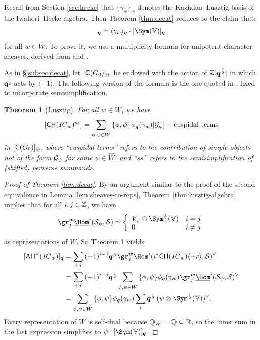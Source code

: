 \documentclass[a4paper,10pt,leqno]{amsart}
\theoremstyle{plain}
\theoremstyle{plain}
\newtheorem{thm}{Theorem}[subsection]
\theoremstyle{plain}
\theoremstyle{definition}
\theoremstyle{remark}
\newcommand{\IC}{\mathit{IC}}
\newcommand{\Q}{\bm{q}}
\newcommand{\Tr}[1]{\langle{#1}\rangle_{\Q}}
\begin{document}
Recall from Section \ref{sec:hecke} that $\{\gamma_w\}_w$ denotes the Kazhdan--Lusztig basis of the Iwahori--Hecke algebra.
Then Theorem \ref{thm:decat} reduces to the claim that:
\begin{align}
[\sf{AH}^\vee(\IC_w)]_{\Q} = \Tr{\gamma_w} \cdot [\Sym(\bb{V})]_{\Q}
\end{align}
for all $w \in W$.
To prove it, we use a multiplicity formula for unipotent character sheaves, derived from \cite[Cor.\ 14.11]{lusztig_1985_3} and \cite[Thm.\ 23.1]{lusztig_1986}.

As in \S\ref{subsec:decat}, let $[\sf{C}(G_0)]_\oplus$ be endowed with the action of $\bb{Z}[\Q^{\frac{1}{2}}]$ in which $\Q^{\frac{1}{2}}$ acts by $\langle -1\rangle$.
The following version of the formula is the one quoted in \cite[413]{ww_2008}, fixed to incorporate semisimplification.

\begin{thm}[Lusztig]\label{thm:lusztig-character}
For all $w \in W$, we have
\begin{align}
{[\sf{CH}(\IC_w)^{ss}]} = \sum_{\phi, \psi \in \hat{W}}
{\{\phi, \psi\}} \phi_{\Q}(\gamma_w) [\cal{G}_\psi] + \text{cuspidal terms}
\end{align}
in $[\sf{C}(G_0)]_\oplus$, where ``cuspidal terms'' refers to the contribution of simple objects not of the form $\cal{G}_\psi$ for some $\psi \in \hat{W}$, and ``$ss$'' refers to the semisimplification of (shifted) perverse summands.
\end{thm}

\begin{proof}[Proof of Theorem \ref{thm:decat}]
By an argument similar to the proof of the second equivalence in Lemma \ref{lem:sheaves-to-reps}, Theorem  \ref{thm:lusztig-algebra} implies that for all $i, j \in \bb{Z}$, we have
\begin{align}
\gr_j^{\bm{w}} \SHom^i(\cal{S}_\psi, \cal{S}) \simeq 
\left\{\begin{array}{ll}
V_\psi \otimes \Sym^{\frac{i}{2}}(\bb{V})
	&i = j\\
0
	&i \neq j
\end{array}\right.
\end{align}
as representations of $W$.
So Theorem \ref{thm:lusztig-character} yields
\begin{align}\begin{split}
[\sf{AH}^\vee(\IC_w)]_{\Q}
&=	\sum_{i, j} {(-1)^{i - j}} 
	\Q^{\frac{j}{2}}
	\gr_j^{\bm{w}} 
	\SHom^i(i^\ast \sf{CH}(\IC_w) \langle -r\rangle, \cal{S})^\vee\\
&=	\sum_{i, j}
	{(-1)^{i - j}}
	\Q^{\frac{j}{2}}
	\sum_{\phi, \psi \in \hat{W}} 
	{\{\phi, \psi\}}
	\phi_{\Q}(\gamma_w)
	\gr_j^{\bm{w}} \SHom^i(\cal{S}_\psi, \cal{S})^\vee\\
&=	\sum_{\phi, \psi \in \hat{W}} 
	{\{\phi, \psi\}}
	\phi_{\Q}(\gamma_w)
	\sum_i
	{\Q^{\frac{i}{2}}}\,
	(\psi \otimes \Sym^{\frac{i}{2}}(\bb{V}))^\vee.
\end{split}\end{align}
Every representation of $W$ is self-dual because $\bb{Q}_W = \bb{Q} \subseteq \bb{R}$, so the inner sum in the last expression simplifies to $\psi \cdot [\Sym(\bb{V})]_{\Q}$.
\end{proof}
\end{document}
